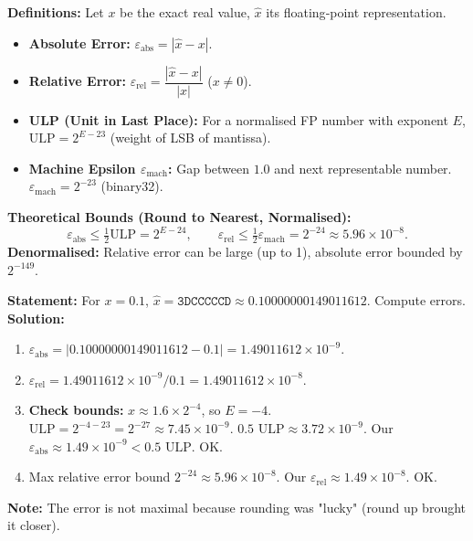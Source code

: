 \documentclass[11pt]{article}
\begin{document}
\begin{methode}
\textbf{Definitions:} Let $x$ be the exact real value, $\hat{x}$ its floating‑point representation.
\begin{itemize}
    \item \textbf{Absolute Error:} $\varepsilon_{\text{abs}} = |\hat{x} - x|$.
    \item \textbf{Relative Error:} $\varepsilon_{\text{rel}} = \dfrac{|\hat{x} - x|}{|x|}$ ($x \neq 0$).
    \item \textbf{ULP (Unit in Last Place):} For a normalised FP number with exponent $E$, $\text{ULP} = 2^{E-23}$ (weight of LSB of mantissa).
    \item \textbf{Machine Epsilon $\varepsilon_{\text{mach}}$:} Gap between $1.0$ and next representable number. $\varepsilon_{\text{mach}} = 2^{-23}$ (binary32).
\end{itemize}
\textbf{Theoretical Bounds (Round to Nearest, Normalised):}
\[
\varepsilon_{\text{abs}} \le \tfrac{1}{2} \text{ULP} = 2^{E-24}, \qquad
\varepsilon_{\text{rel}} \le \tfrac{1}{2} \varepsilon_{\text{mach}} = 2^{-24} \approx 5.96 \times 10^{-8}.
\]
\textbf{Denormalised:} Relative error can be large (up to 1), absolute error bounded by $2^{-149}$.
\end{methode}

\begin{exoresolu}
\textbf{Statement:} For $x=0.1$, $\hat{x} = \mathtt{3DCCCCCD} \approx 0.10000000149011612$. Compute errors.
\tcblower
\textbf{Solution:}
\begin{enumerate}
    \item $\varepsilon_{\text{abs}} = |0.10000000149011612 - 0.1| = 1.49011612 \times 10^{-9}$.
    \item $\varepsilon_{\text{rel}} = 1.49011612 \times 10^{-9} / 0.1 = 1.49011612 \times 10^{-8}$.
    \item \textbf{Check bounds:} $x \approx 1.6 \times 2^{-4}$, so $E=-4$. $\text{ULP} = 2^{-4-23} = 2^{-27} \approx 7.45 \times 10^{-9}$.
        $0.5 \text{ ULP} \approx 3.72 \times 10^{-9}$. Our $\varepsilon_{\text{abs}} \approx 1.49 \times 10^{-9} < 0.5 \text{ ULP}$. OK.
    \item Max relative error bound $2^{-24} \approx 5.96 \times 10^{-8}$. Our $\varepsilon_{\text{rel}} \approx 1.49 \times 10^{-8}$. OK.
\end{enumerate}
\textbf{Note:} The error is not maximal because rounding was "lucky" (round up brought it closer).
\end{exoresolu}
\end{document}
